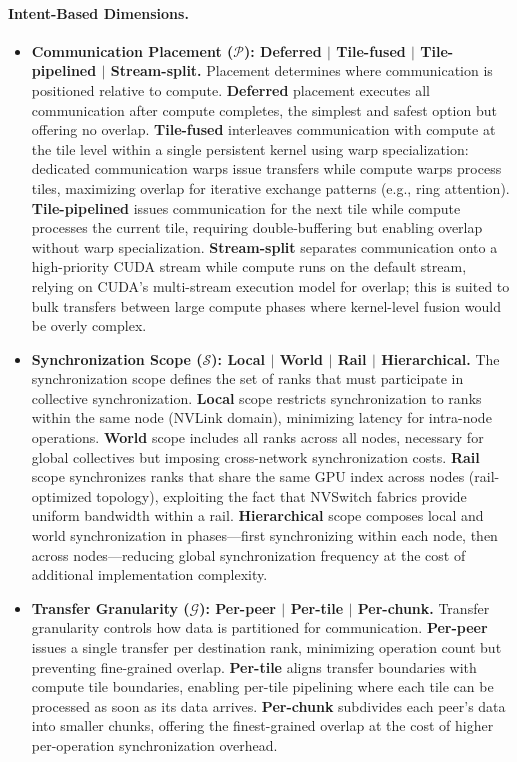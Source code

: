\paragraph{Intent-Based Dimensions.}

\begin{itemize}[leftmargin=1.4em,itemsep=2pt,topsep=2pt]

\item \textbf{Communication Placement ($\mathcal{P}$): Deferred $|$ Tile-fused $|$ Tile-pipelined $|$ Stream-split.}
Placement determines where communication is positioned relative to compute. \textbf{Deferred} placement executes all communication after compute completes, the simplest and safest option but offering no overlap. \textbf{Tile-fused} interleaves communication with compute at the tile level within a single persistent kernel using warp specialization: dedicated communication warps issue transfers while compute warps process tiles, maximizing overlap for iterative exchange patterns (e.g., ring attention). \textbf{Tile-pipelined} issues communication for the next tile while compute processes the current tile, requiring double-buffering but enabling overlap without warp specialization. \textbf{Stream-split} separates communication onto a high-priority CUDA stream while compute runs on the default stream, relying on CUDA's multi-stream execution model for overlap; this is suited to bulk transfers between large compute phases where kernel-level fusion would be overly complex.

\item \textbf{Synchronization Scope ($\mathcal{S}$): Local $|$ World $|$ Rail $|$ Hierarchical.}
The synchronization scope defines the set of ranks that must participate in collective synchronization. \textbf{Local} scope restricts synchronization to ranks within the same node (NVLink domain), minimizing latency for intra-node operations. \textbf{World} scope includes all ranks across all nodes, necessary for global collectives but imposing cross-network synchronization costs. \textbf{Rail} scope synchronizes ranks that share the same GPU index across nodes (rail-optimized topology), exploiting the fact that NVSwitch fabrics provide uniform bandwidth within a rail. \textbf{Hierarchical} scope composes local and world synchronization in phases---first synchronizing within each node, then across nodes---reducing global synchronization frequency at the cost of additional implementation complexity.

\item \textbf{Transfer Granularity ($\mathcal{G}$): Per-peer $|$ Per-tile $|$ Per-chunk.}
Transfer granularity controls how data is partitioned for communication. \textbf{Per-peer} issues a single transfer per destination rank, minimizing operation count but preventing fine-grained overlap. \textbf{Per-tile} aligns transfer boundaries with compute tile boundaries, enabling per-tile pipelining where each tile can be processed as soon as its data arrives. \textbf{Per-chunk} subdivides each peer's data into smaller chunks, offering the finest-grained overlap at the cost of higher per-operation synchronization overhead.

\end{itemize}

